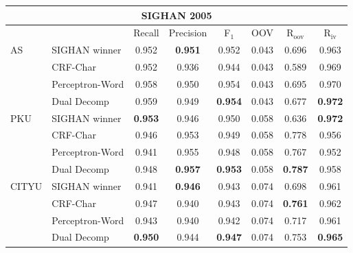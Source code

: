 \documentclass[11pt]{article}
\begin{document}
\begin{table*}
\centering

\begin{tabular}{ l | l | c | c | c | c | c | c   }
\multicolumn{8}{c}{\large{SIGHAN 2005}} \\
\hline
    \multicolumn{2}{c}{}  &  \multicolumn{1}{c}{Recall} &  \multicolumn{1}{c}{Precision}  & \multicolumn{1}{c}{F$_1$}   &  \multicolumn{1}{c}{OOV} &   \multicolumn{1}{c|}{R$_{\mathrm{oov}}$}    &  \multicolumn{1}{c}{R$_{\mathrm{iv}}$}   \\ 
\hline
\multirow{4}{*}{AS} & SIGHAN winner      & 0.952 &  \textbf{0.951} & 0.952 &  0.043  &  0.696 &  0.963 \\
& CRF-Char                                                        & 0.952 &   0.936 & 0.944 & 0.043 &  0.589 & 0.969 \\
 & Perceptron-Word                                       & 0.958 & 0.950 & 0.954 & 0.043 & 0.695 & 0.970 \\ 
& Dual Decomp                                       & 0.959 & 0.949 & \textbf{0.954} & 0.043 & {0.677} & \textbf{0.972} \\
\hline

\multirow{4}{*}{PKU} &  SIGHAN winner       & \textbf{0.953}  &      0.946 &  0.950 & 0.058  &  0.636 &  \textbf{0.972} \\
& CRF-Char        & 0.946 &	0.953 & 0.949 &  0.058 &   0.778 &  0.956 \\
& Perceptron-Word  & 0.941 & 0.955	& 0.948 &  0.058 &  0.767 &  0.952 \\
& Dual Decomp  & 0.948 & \textbf{0.957} & \textbf{0.953} &  0.058 &  \textbf{0.787} &0.958 \\
\hline

\multirow{4}{*}{CITYU}  & SIGHAN winner       &  0.941 &  \textbf{0.946} & 0.943 & 0.074 & 0.698 & 0.961 \\
& CRF-Char       & 0.947 & 0.940 &  0.943 &  0.074 & \textbf{0.761} & 0.962 \\
& Perceptron-Word & 0.943 & 0.940 & 0.942 & 0.074 & 0.717  & 0.961  \\
& Dual Decomp & \textbf{0.950} & 0.944 & \textbf{0.947} & 0.074 & {0.753} & \textbf{0.965}  \\


\end{tabular}
\end{table*}
\end{document}
